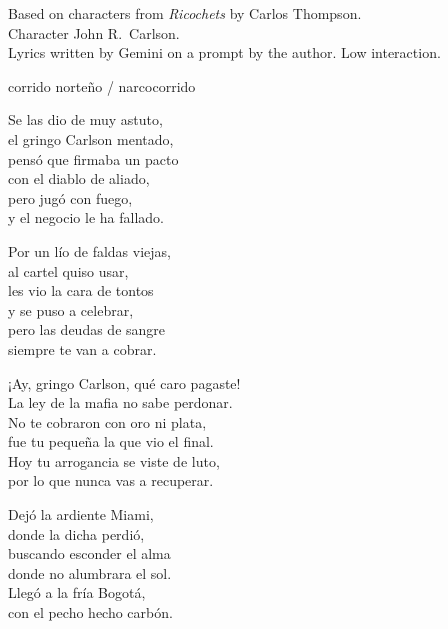 

\begin{notes}
Based on characters from \emph{Ricochets} by Carlos Thompson.\\
Character John R.~Carlson.\\
Lyrics written by Gemini on a prompt by the author. %
Low interaction.
\end{notes}

\begin{style}
corrido norteño / narcocorrido
\end{style}

\begin{lyrics}

Se las dio de muy astuto,\\
el gringo Carlson mentado,\\
pensó que firmaba un pacto\\
con el diablo de aliado,\\
pero jugó con fuego,\\
y el negocio le ha fallado.

Por un lío de faldas viejas,\\
al cartel quiso usar,\\
les vio la cara de tontos\\
y se puso a celebrar,\\
pero las deudas de sangre\\
siempre te van a cobrar.

¡Ay, gringo Carlson, qué caro pagaste!\\
La ley de la mafia no sabe perdonar.\\
No te cobraron con oro ni plata,\\
fue tu pequeña la que vio el final.\\
Hoy tu arrogancia se viste de luto,\\
por lo que nunca vas a recuperar.

Dejó la ardiente Miami,\\
donde la dicha perdió,\\
buscando esconder el alma\\
donde no alumbrara el sol.\\
Llegó a la fría Bogotá,\\
con el pecho hecho carbón.


\end{lyrics}
